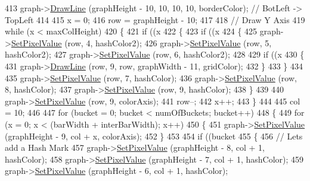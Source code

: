 \begin{DoxyCode}
413   graph->\hyperlink{class_k_k_b_1_1_raster_a118bf0fa32356ddea42f579c044c65cd}{DrawLine} (graphHeight - 10,              10,               10,              10, 
      borderColor);  \textcolor{comment}{// BotLeft  -> TopLeft}
414 
415   x = 0;
416   row = graphHeight - 10;
417 
418   \textcolor{comment}{// Draw Y Axis}
419   \textcolor{keywordflow}{while}  (x < maxColHeight)
420   \{
421     \textcolor{keywordflow}{if}  ((x %
422     \{
423       \textcolor{keywordflow}{if}  ((x %
424       \{
425         graph->\hyperlink{class_k_k_b_1_1_raster_a5ddb8bd069dc64241941b0b011af8667}{SetPixelValue} (row, 4, hashColor2);
426         graph->\hyperlink{class_k_k_b_1_1_raster_a5ddb8bd069dc64241941b0b011af8667}{SetPixelValue} (row, 5, hashColor2);
427         graph->\hyperlink{class_k_k_b_1_1_raster_a5ddb8bd069dc64241941b0b011af8667}{SetPixelValue} (row, 6, hashColor2);
428 
429         \textcolor{keywordflow}{if}  ((x %
430         \{
431           graph->\hyperlink{class_k_k_b_1_1_raster_a118bf0fa32356ddea42f579c044c65cd}{DrawLine} (row, 9, row, graphWidth - 11, gridColor);
432         \}
433       \}
434 
435       graph->\hyperlink{class_k_k_b_1_1_raster_a5ddb8bd069dc64241941b0b011af8667}{SetPixelValue} (row, 7, hashColor);
436       graph->\hyperlink{class_k_k_b_1_1_raster_a5ddb8bd069dc64241941b0b011af8667}{SetPixelValue} (row, 8, hashColor);
437       graph->\hyperlink{class_k_k_b_1_1_raster_a5ddb8bd069dc64241941b0b011af8667}{SetPixelValue} (row, 9, hashColor);
438     \}
439 
440     graph->\hyperlink{class_k_k_b_1_1_raster_a5ddb8bd069dc64241941b0b011af8667}{SetPixelValue} (row, 9, colorAxis);
441     row--;
442     x++;
443   \}
444 
445   col = 10;
446 
447   \textcolor{keywordflow}{for}  (bucket = 0;  bucket < numOfBuckets;  bucket++)
448   \{
449     \textcolor{keywordflow}{for}  (x = 0;  x < (barWidth + interBarWidth);  x++)
450     \{
451       graph->\hyperlink{class_k_k_b_1_1_raster_a5ddb8bd069dc64241941b0b011af8667}{SetPixelValue} (graphHeight - 9, col + x, colorAxis);
452     \}
453 
454     \textcolor{keywordflow}{if}  ((bucket %
455     \{
456       \textcolor{comment}{// Lets add a Hash Mark}
457       graph->\hyperlink{class_k_k_b_1_1_raster_a5ddb8bd069dc64241941b0b011af8667}{SetPixelValue} (graphHeight - 8, col + 1, hashColor);
458       graph->\hyperlink{class_k_k_b_1_1_raster_a5ddb8bd069dc64241941b0b011af8667}{SetPixelValue} (graphHeight - 7, col + 1, hashColor);
459       graph->\hyperlink{class_k_k_b_1_1_raster_a5ddb8bd069dc64241941b0b011af8667}{SetPixelValue} (graphHeight - 6, col + 1, hashColor);

\end{DoxyCode}
